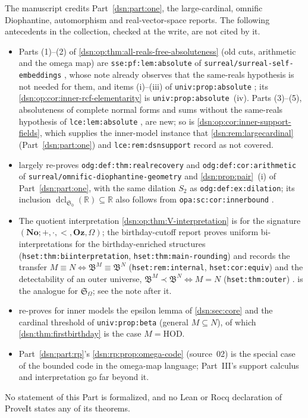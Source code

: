 \documentclass[11pt,a4paper]{article}
\numberwithin{equation}{section}
\theoremstyle{definition}
\theoremstyle{remark}
\newcommand{\No}{\mathbf{No}}
\newcommand{\Oz}{\mathbf{Oz}}
\newcommand{\HOD}{\mathrm{HOD}}
\newcommand{\R}{\mathbb R}
\newcommand{\dcl}{\operatorname{dcl}}
\newcommand{\repopath}[1]{\nolinkurl{#1}}
\newcommand{\lbl}[1]{\nolinkurl{#1}}
\newcommand{\Szero}{\mathfrak S_0}
\newcommand{\Somega}{\mathfrak S_\Omega}
\begin{document}
The manuscript credits Part~\ref{dsn:part:one}, the large-cardinal, omnific
Diophantine, automorphism and real-vector-space reports. The following
antecedents in the collection, checked at the write, are not cited by it.
\begin{itemize}
\item Parts (1)--(2) of \cref{dsn:op:thm:all-reals-free-absoluteness}
(old cuts, arithmetic and the omega map) are \lbl{sse:pf:lem:absolute} of
\repopath{surreal/surreal-self-embeddings} \cite{RepoSse}, whose note already
observes that the same-reals hypothesis is not needed for them, and items
(i)--(iii) of \lbl{univ:prop:absolute} \cite{RepoUniv}; its
\cref{dsn:op:cor:inner-rcf-elementarity} is \lbl{univ:prop:absolute}~(iv).
Parts (3)--(5), absoluteness of complete normal forms and sums without the
same-reals hypothesis of \lbl{lce:lem:absolute} \cite{RepoLce}, are new; so is
\cref{dsn:op:cor:inner-support-fields}, which supplies the inner-model instance
that \cref{dsn:rem:largecardinal} (Part~\ref{dsn:part:one}) and
\lbl{lce:rem:dsnsupport} record as not covered.
\item {} largely re-proves
\lbl{odg:def:thm:realrecovery} and \lbl{odg:def:cor:arithmetic} of
\repopath{surreal/omnific-diophantine-geometry} \cite{RepoOdg} and
\cref{dsn:prop:pair}~(i) of Part~\ref{dsn:part:one}, with the same dilation
$S_2$ as \lbl{odg:def:ex:dilation}; its inclusion
$\dcl_{\Szero}(\R)\subseteq\R$ also follows from
\lbl{opa:sc:cor:innerbound} \cite{RepoOpa}.
\item The quotient interpretation \cref{dsn:op:thm:V-interpretation} is for
the signature $(\No;+,\cdot,<,\Oz,\Omega)$; the birthday-cutoff report proves
uniform bi-interpretations for the birthday-enriched structures
(\lbl{hset:thm:biinterpretation}, \lbl{hset:thm:main-rounding}) and records
the transfer $M\equiv N\iff\mathfrak B^M\equiv\mathfrak B^N$
(\lbl{hset:rem:internal}, \lbl{hset:cor:equiv}) and the detectability of an
outer universe, $\mathfrak B^M\prec\mathfrak B^N\iff M=N$
(\lbl{hset:thm:outer}) \cite{RepoHset}.  is
the analogue for $\Somega$; see the note after it.
\item {} re-proves for inner models the epsilon
lemma of \cref{dsn:sec:core} and the cardinal threshold of
\lbl{univ:prop:beta} \cite{RepoUniv} (general $M\subseteq N$), of which
\cref{dsn:thm:firstbirthday} is the case $M=\HOD$.
\item Part~\ref{dsn:part:rp}'s \cref{dsn:rp:prop:omega-code} (source~02) is the
special case of the bounded code in the omega-map language; Part~III's support
calculus and interpretation go far beyond it.
\end{itemize}
No statement of this Part is formalized, and no Lean or Rocq declaration of
ProveIt states any of its theorems.
\end{document}
